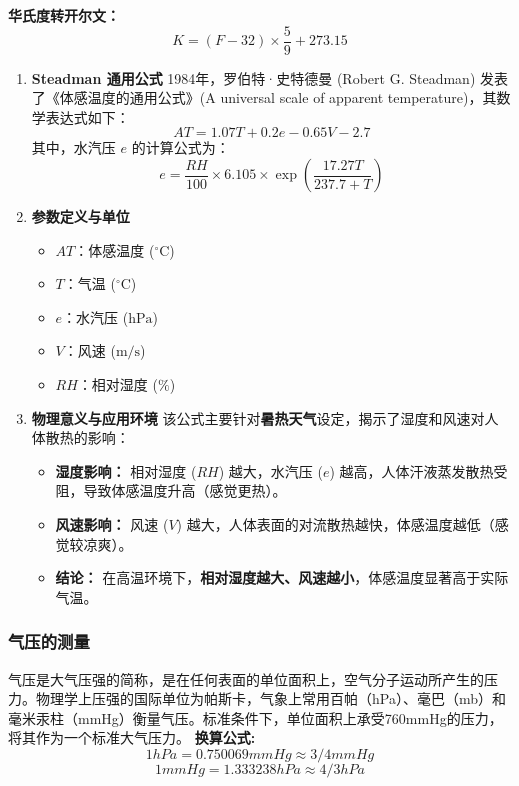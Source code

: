 \documentclass[12pt,a4paper]{article}
\begin{document}
			\textbf{华氏度转开尔文：}
			$$	K = (F - 32) \times \frac{5}{9} + 273.15$$
	\begin{enumerate}
		\item \textbf{Steadman 通用公式}
		1984年，罗伯特·史特德曼 (Robert G. Steadman) 发表了《体感温度的通用公式》(A universal scale of apparent temperature)，其数学表达式如下：
		\begin{equation}
			AT = 1.07T + 0.2e - 0.65V - 2.7
		\end{equation}
		其中，水汽压 $e$ 的计算公式为：
		\begin{equation}
			e = \frac{RH}{100} \times 6.105 \times \exp \left( \frac{17.27T}{237.7 + T} \right)
		\end{equation}
		
		\item \textbf{参数定义与单位}
		\begin{itemize}
			\item $AT$：体感温度 ($^{\circ}\text{C}$)
			\item $T$：气温 ($^{\circ}\text{C}$)
			\item $e$：水汽压 ($\text{hPa}$)
			\item $V$：风速 ($\text{m/s}$)
			\item $RH$：相对湿度 ($\%$)
		\end{itemize}
		
		\item \textbf{物理意义与应用环境}
		该公式主要针对\textbf{暑热天气}设定，揭示了湿度和风速对人体散热的影响：
		\begin{itemize}
			\item \textbf{湿度影响：} 相对湿度 ($RH$) 越大，水汽压 ($e$) 越高，人体汗液蒸发散热受阻，导致体感温度升高（感觉更热）。
			\item \textbf{风速影响：} 风速 ($V$) 越大，人体表面的对流散热越快，体感温度越低（感觉较凉爽）。
			\item \textbf{结论：} 在高温环境下，\textbf{相对湿度越大、风速越小}，体感温度显著高于实际气温。
		\end{itemize}
	\end{enumerate}
	
	\subsubsection{气压的测量}
	
	气压是大气压强的简称，是在任何表面的单位面积上，空气分子运动所产生的压力。物理学上压强的国际单位为帕斯卡，气象上常用百帕（hPa）、毫巴（mb）和毫米汞柱（mmHg）衡量气压。标准条件下，单位面积上承受760mmHg的压力，将其作为一个标准大气压力。
	\textbf{换算公式:}
	$$1hPa=0.750069mmHg\approx 3/4mmHg$$
	$$1mmHg=1.333238hPa\approx 4/3hPa$$
	
\end{document}
